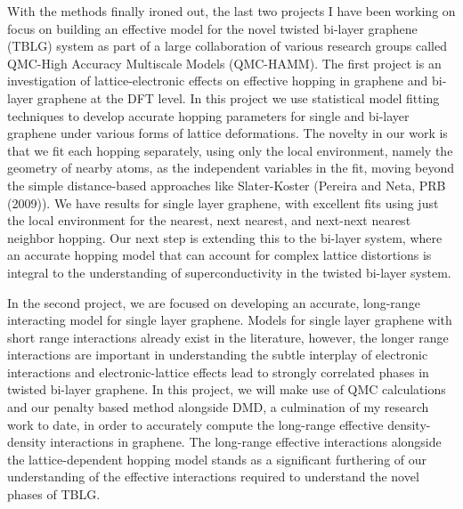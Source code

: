 \documentclass{article}
\begin{document}
With the methods finally ironed out, the last two projects I have been working on focus on building an effective model for the novel twisted bi-layer graphene (TBLG) system as part of a large collaboration of various research groups called QMC-High Accuracy Multiscale Models (QMC-HAMM).
The first project is an investigation of lattice-electronic effects on effective hopping in graphene and bi-layer graphene at the DFT level.
In this project we use statistical model fitting techniques to develop accurate hopping parameters for single and bi-layer graphene under various forms of lattice deformations.
The novelty in our work is that we fit each hopping separately, using only the local environment, namely the geometry of nearby atoms, as the independent variables in the fit, moving beyond the simple distance-based approaches like Slater-Koster (Pereira and Neta, PRB (2009)).
We have results for single layer graphene, with excellent fits using just the local environment for the nearest, next nearest, and next-next nearest neighbor hopping.
Our next step is extending this to the bi-layer system, where an accurate hopping model that can account for complex lattice distortions is integral to the understanding of superconductivity in the twisted bi-layer system.

In the second project, we are focused on developing an accurate, long-range interacting model for single layer graphene.
Models for single layer graphene with short range interactions already exist in the literature, however, the longer range interactions are important in understanding the subtle interplay of electronic interactions and electronic-lattice effects lead to strongly correlated phases in twisted bi-layer graphene.
In this project, we will make use of QMC calculations and our penalty based method alongside DMD, a culmination of my research work to date, in order to accurately compute the long-range effective density-density interactions in graphene.
The long-range effective interactions alongside the lattice-dependent hopping model stands as a significant furthering of our understanding of the effective interactions required to understand the novel phases of TBLG.
\end{document}
